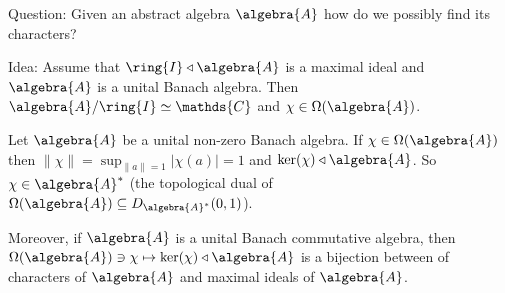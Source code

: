 \documentclass[a4paper]{article}
\begin{document}
Question: Given an abstract algebra $\algebra{A}$ how do we possibly find its characters? 

Idea: Assume that $\ring{I} \triangleleft \algebra{A}$ is a maximal ideal and $\algebra{A}$ is a unital Banach algebra.
Then $\algebra{A} / \ring{I} \simeq \mathds{C}$ and $\chi \in \Omega(\algebra{A})$. 

\begin{theorem}
	Let $\algebra{A}$ be a unital non-zero Banach algebra.
	If $\chi \in \Omega(\algebra{A})$ then $\| \chi \| = \sup_{\|a\| = 1} |\chi(a)| = 1$ and $\ker(\chi) \triangleleft \algebra{A}$.
	So $\chi \in \algebra{A}^*$ (the topological dual of $\Omega(\algebra{A}) \subseteq D_{\algebra{A}^*}(0,1)$).

	Moreover, if $\algebra{A}$ is a unital Banach commutative algebra, then $\Omega(\algebra{A}) \ni \chi \mapsto \ker(\chi) \triangleleft \algebra{A}$ is a bijection between of characters of $\algebra{A}$ and maximal ideals of $\algebra{A}$.
\end{theorem}
\end{document}
